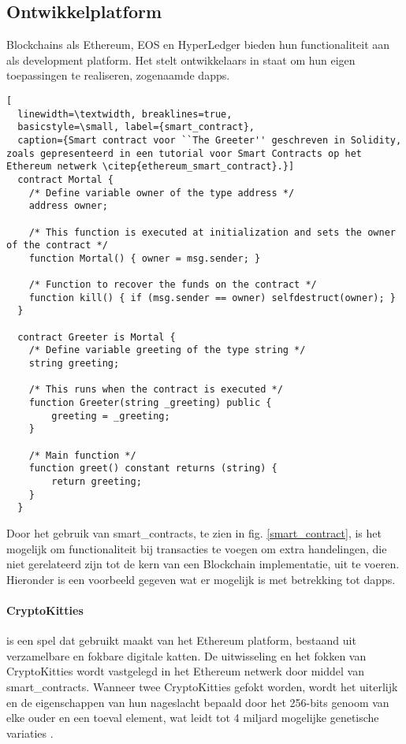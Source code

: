 \clearpage
\subsection{Ontwikkelplatform}
Blockchains als Ethereum, EOS en HyperLedger bieden hun functionaliteit aan als development platform. Het stelt ontwikkelaars in staat om hun eigen toepassingen te realiseren, zogenaamde \gls{dapps}.

\begin{lstlisting}[
  linewidth=\textwidth, breaklines=true, 
  basicstyle=\small, label={smart_contract},
  caption={Smart contract voor ``The Greeter'' geschreven in Solidity, zoals gepresenteerd in een tutorial voor Smart Contracts op het Ethereum netwerk \citep{ethereum_smart_contract}.}]
  contract Mortal {
    /* Define variable owner of the type address */
    address owner;

    /* This function is executed at initialization and sets the owner of the contract */
    function Mortal() { owner = msg.sender; }

    /* Function to recover the funds on the contract */
    function kill() { if (msg.sender == owner) selfdestruct(owner); }
  }

  contract Greeter is Mortal {
    /* Define variable greeting of the type string */
    string greeting;

    /* This runs when the contract is executed */
    function Greeter(string _greeting) public {
        greeting = _greeting;
    }

    /* Main function */
    function greet() constant returns (string) {
        return greeting;
    }
  }
\end{lstlisting}

Door het gebruik van \glspl{smart_contract}, te zien in fig. \ref{smart_contract}, is het mogelijk om functionaliteit bij transacties te voegen om extra handelingen, die niet gerelateerd zijn tot de kern van een Blockchain implementatie, uit te voeren. Hieronder is een voorbeeld gegeven wat er mogelijk is met betrekking tot \gls{dapps}.

\paragraph{CryptoKitties} is een spel dat gebruikt maakt van het Ethereum platform, bestaand uit verzamelbare en fokbare digitale katten. De uitwisseling en het fokken van CryptoKitties wordt vastgelegd in het Ethereum netwerk door middel van \glspl{smart_contract}. Wanneer twee CryptoKitties gefokt worden, wordt het uiterlijk en de eigenschappen van hun nageslacht bepaald door het 256-bits genoom van elke ouder en een toeval element, wat leidt tot 4 miljard mogelijke genetische variaties \citep{cryptokitties}.
